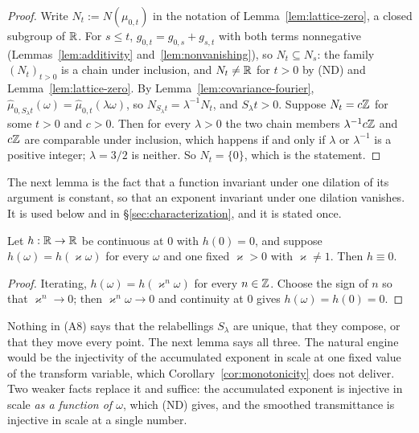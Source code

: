 \begin{proof}
Write $N_t := N(\mu_{0,t})$ in the notation of Lemma~\ref{lem:lattice-zero}, a closed
subgroup of $\mathbb{R}$. For $s \le t$, $g_{0,t} = g_{0,s} + g_{s,t}$ with both terms nonnegative
(Lemmas~\ref{lem:additivity} and~\ref{lem:nonvanishing}), so $N_t \subseteq N_s$: the family
$(N_t)_{t>0}$ is a chain under inclusion, and $N_t \ne \mathbb{R}$ for $t > 0$ by (ND) and
Lemma~\ref{lem:lattice-zero}. By Lemma~\ref{lem:covariance-fourier},
$\hat\mu_{0,S_\lambda t}(\omega) = \hat\mu_{0,t}(\lambda\omega)$, so
$N_{S_\lambda t} = \lambda^{-1}N_t$, and $S_\lambda t > 0$. Suppose $N_t = c\mathbb{Z}$ for some
$t > 0$ and $c > 0$. Then for every $\lambda > 0$ the two chain members $\lambda^{-1}c\mathbb{Z}$ and
$c\mathbb{Z}$ are comparable under inclusion, which happens if and only if $\lambda$ or
$\lambda^{-1}$ is a positive integer; $\lambda = 3/2$ is neither. So $N_t = \{0\}$, which is
the statement.
\end{proof}

The next lemma is the fact that a function invariant under one dilation of its argument
is constant, so that an exponent invariant under one dilation vanishes. It is used below
and in \S\ref{sec:characterization}, and it is stated once.

\begin{lemma}\label{lem:dilation-invariance}
Let $h : \mathbb{R} \to \mathbb{R}$ be continuous at $0$ with $h(0) = 0$, and suppose
$h(\omega) = h(\varkappa\omega)$ for every $\omega$ and one fixed $\varkappa > 0$ with
$\varkappa \ne 1$. Then $h \equiv 0$.
\end{lemma}

\begin{proof}
Iterating, $h(\omega) = h(\varkappa^n\omega)$ for every $n \in \mathbb{Z}$. Choose the sign of $n$ so
that $\varkappa^n \to 0$; then $\varkappa^n\omega \to 0$ and continuity at $0$ gives
$h(\omega) = h(0) = 0$.
\end{proof}

Nothing in (A8) says that the relabellings $S_\lambda$ are unique, that they compose, or that
they move every point. The next lemma says all three. The natural engine would be the
injectivity of the accumulated exponent in scale at one fixed value of the transform
variable, which Corollary~\ref{cor:monotonicity} does not deliver. Two weaker facts
replace it and suffice: the accumulated exponent is injective in scale \emph{as a function of
$\omega$}, which (ND) gives, and the smoothed transmittance is injective in scale at a
single number.

